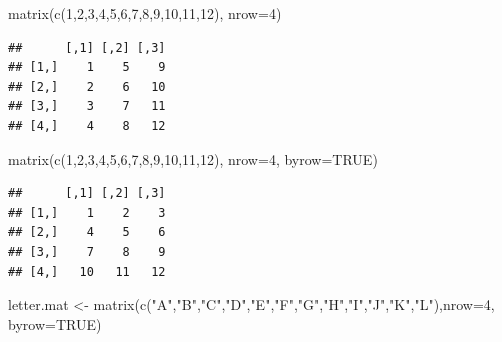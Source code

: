 \documentclass[a4paper]{book}
\newenvironment{Shaded}{}{}
\newcommand{\KeywordTok}[1]{\textcolor[rgb]{0.00,0.00,1.00}{{#1}}}
\newcommand{\DataTypeTok}[1]{{#1}}
\newcommand{\DecValTok}[1]{{#1}}
\newcommand{\StringTok}[1]{\textcolor[rgb]{0.00,0.50,0.50}{{#1}}}
\newcommand{\OtherTok}[1]{\textcolor[rgb]{1.00,0.25,0.00}{{#1}}}
\newcommand{\NormalTok}[1]{{#1}}
\newlength{\leftbarwidth}
\newlength{\leftbarsep}
\newcommand*{\leftbarcolorcmd}{\color{darkgray}}%
\renewenvironment{leftbar}{%
    \def\FrameCommand{{\leftbarcolorcmd{\vrule width \leftbarwidth\relax\hspace {\leftbarsep}}}}%
    \MakeFramed {\advance \hsize -\width \FrameRestore }%
}{%
    \endMakeFramed
}
\renewenvironment{Shaded}
{\vspace{0em}\begin{leftbar}\begin{snugshade}}
{\end{snugshade}\end{leftbar}\vspace{0pt}}
\begin{document}
\begin{Shaded}
\begin{Highlighting}[]
\KeywordTok{matrix}\NormalTok{(}\KeywordTok{c}\NormalTok{(}\DecValTok{1}\NormalTok{,}\DecValTok{2}\NormalTok{,}\DecValTok{3}\NormalTok{,}\DecValTok{4}\NormalTok{,}\DecValTok{5}\NormalTok{,}\DecValTok{6}\NormalTok{,}\DecValTok{7}\NormalTok{,}\DecValTok{8}\NormalTok{,}\DecValTok{9}\NormalTok{,}\DecValTok{10}\NormalTok{,}\DecValTok{11}\NormalTok{,}\DecValTok{12}\NormalTok{), }\DataTypeTok{nrow=}\DecValTok{4}\NormalTok{)}
\end{Highlighting}
\end{Shaded}

\begin{verbatim}
##      [,1] [,2] [,3]
## [1,]    1    5    9
## [2,]    2    6   10
## [3,]    3    7   11
## [4,]    4    8   12
\end{verbatim}

\begin{Shaded}
\begin{Highlighting}[]
\KeywordTok{matrix}\NormalTok{(}\KeywordTok{c}\NormalTok{(}\DecValTok{1}\NormalTok{,}\DecValTok{2}\NormalTok{,}\DecValTok{3}\NormalTok{,}\DecValTok{4}\NormalTok{,}\DecValTok{5}\NormalTok{,}\DecValTok{6}\NormalTok{,}\DecValTok{7}\NormalTok{,}\DecValTok{8}\NormalTok{,}\DecValTok{9}\NormalTok{,}\DecValTok{10}\NormalTok{,}\DecValTok{11}\NormalTok{,}\DecValTok{12}\NormalTok{), }\DataTypeTok{nrow=}\DecValTok{4}\NormalTok{, }\DataTypeTok{byrow=}\OtherTok{TRUE}\NormalTok{)}
\end{Highlighting}
\end{Shaded}

\begin{verbatim}
##      [,1] [,2] [,3]
## [1,]    1    2    3
## [2,]    4    5    6
## [3,]    7    8    9
## [4,]   10   11   12
\end{verbatim}

\begin{Shaded}
\begin{Highlighting}[]
\NormalTok{letter.mat <-}\StringTok{ }\KeywordTok{matrix}\NormalTok{(}\KeywordTok{c}\NormalTok{(}\StringTok{"A"}\NormalTok{,}\StringTok{"B"}\NormalTok{,}\StringTok{"C"}\NormalTok{,}\StringTok{"D"}\NormalTok{,}\StringTok{"E"}\NormalTok{,}\StringTok{"F"}\NormalTok{,}\StringTok{"G"}\NormalTok{,}\StringTok{"H"}\NormalTok{,}\StringTok{"I"}\NormalTok{,}\StringTok{"J"}\NormalTok{,}\StringTok{"K"}\NormalTok{,}\StringTok{"L"}\NormalTok{),}\DataTypeTok{nrow=}\DecValTok{4}\NormalTok{, }\DataTypeTok{byrow=}\OtherTok{TRUE}\NormalTok{)}
\end{Highlighting}
\end{Shaded}
\end{document}
